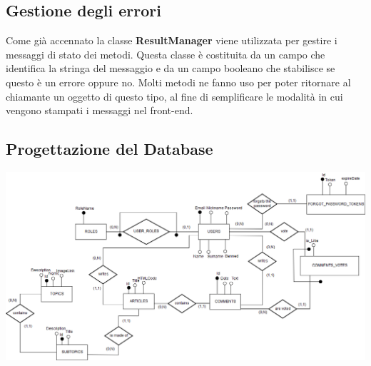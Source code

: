 \documentclass[12pt]{article}
\begin{document}
	\subsection{Gestione degli errori}
	Come già accennato la classe \textbf{ResultManager} viene utilizzata per gestire i messaggi di stato dei metodi.
	Questa classe è costituita da un campo che identifica la stringa del messaggio e da un campo booleano che stabilisce se questo è un errore oppure no.
	Molti metodi ne fanno uso per poter ritornare al chiamante un oggetto di questo tipo, al fine di semplificare le modalità in cui vengono stampati i messaggi nel front-end.
	
	\subsection{Progettazione del Database}
	\includegraphics[scale=0.34]{img/ER_DevSpace.png}	
	
\end{document}
